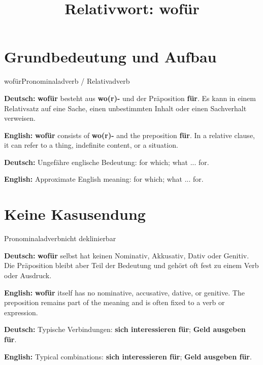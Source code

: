 \documentclass[a4paper,11pt]{article}
\title{Relativwort: \glqq wofür\grqq{}}
\date{}
\newcommand{\GermanText}[1]{\textbf{Deutsch: }#1\par}
\newcommand{\EnglishText}[1]{{\small\color{SoftGray}\textbf{English: }#1\par}}
\begin{document}
\maketitle

\tableofcontents

\newpage

\section{Grundbedeutung und Aufbau}

\begin{grammarentry}{wofür}{Pronominaladverb / Relativadverb}

\GermanText{\textbf{wofür} besteht aus \textbf{wo(r)-} und der Präposition \textbf{für}. Es kann in einem Relativsatz auf eine Sache, einen unbestimmten Inhalt oder einen Sachverhalt verweisen.}

\EnglishText{\textbf{wofür} consists of \textbf{wo(r)-} and the preposition \textbf{für}. In a relative clause, it can refer to a thing, indefinite content, or a situation.}

\GermanText{Ungefähre englische Bedeutung: \glqq for which; what ... for\grqq{}.}

\EnglishText{Approximate English meaning: \glqq for which; what ... for\grqq{}.}

\end{grammarentry}

\section{Keine Kasusendung}

\begin{grammarentry}{Pronominaladverb}{nicht deklinierbar}

\GermanText{\textbf{wofür} selbst hat keinen Nominativ, Akkusativ, Dativ oder Genitiv. Die Präposition bleibt aber Teil der Bedeutung und gehört oft fest zu einem Verb oder Ausdruck.}

\EnglishText{\textbf{wofür} itself has no nominative, accusative, dative, or genitive. The preposition remains part of the meaning and is often fixed to a verb or expression.}

\GermanText{Typische Verbindungen: \textbf{sich interessieren für}; \textbf{Geld ausgeben für}.}

\EnglishText{Typical combinations: \textbf{sich interessieren für}; \textbf{Geld ausgeben für}.}

\end{grammarentry}
\end{document}
